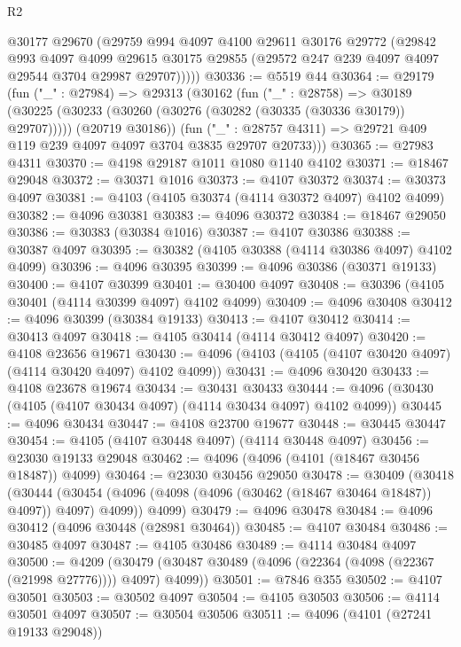 \begin{lexlean}{R2}
\begin{coremodule}
        @30177
        @29670
        (@29759
          @994
          @4097
          @4100
          @29611
          @30176
          @29772
          (@29842
            @993
            @4097
            @4099
            @29615
            @30175
            @29855
            (@29572 @247 @239 @4097 @4097 @29544 @3704 @29987 @29707)))))
@30336 := @5519 @44
@30364 := @29179
    (fun ("_" : @27984) =>
    @29313
      (@30162
        (fun ("_" : @28758) =>
        @30189
          (@30225 (@30233 (@30260 (@30276 (@30282 (@30335 (@30336 @30179)) @29707)))))
          (@20719 @30186))
        (fun ("_" : @28757 @4311) => @29721 @409 @119 @239 @4097 @4097 @3704 @3835 @29707 @20733)))
@30365 := @27983 @4311
@30370 := @4198 @29187 @1011 @1080 @1140 @4102
@30371 := @18467 @29048
@30372 := @30371 @1016
@30373 := @4107 @30372
@30374 := @30373 @4097
@30381 := @4103 (@4105 @30374 (@4114 @30372 @4097) @4102 @4099)
@30382 := @4096 @30381
@30383 := @4096 @30372
@30384 := @18467 @29050
@30386 := @30383 (@30384 @1016)
@30387 := @4107 @30386
@30388 := @30387 @4097
@30395 := @30382 (@4105 @30388 (@4114 @30386 @4097) @4102 @4099)
@30396 := @4096 @30395
@30399 := @4096 @30386 (@30371 @19133)
@30400 := @4107 @30399
@30401 := @30400 @4097
@30408 := @30396 (@4105 @30401 (@4114 @30399 @4097) @4102 @4099)
@30409 := @4096 @30408
@30412 := @4096 @30399 (@30384 @19133)
@30413 := @4107 @30412
@30414 := @30413 @4097
@30418 := @4105 @30414 (@4114 @30412 @4097)
@30420 := @4108 @23656 @19671
@30430 := @4096 (@4103 (@4105 (@4107 @30420 @4097) (@4114 @30420 @4097) @4102 @4099))
@30431 := @4096 @30420
@30433 := @4108 @23678 @19674
@30434 := @30431 @30433
@30444 := @4096 (@30430 (@4105 (@4107 @30434 @4097) (@4114 @30434 @4097) @4102 @4099))
@30445 := @4096 @30434
@30447 := @4108 @23700 @19677
@30448 := @30445 @30447
@30454 := @4105 (@4107 @30448 @4097) (@4114 @30448 @4097)
@30456 := @23030 @19133 @29048
@30462 := @4096 (@4096 (@4101 (@18467 @30456 @18487)) @4099)
@30464 := @23030 @30456 @29050
@30478 := @30409
    (@30418
      (@30444 (@30454 (@4096 (@4098 (@4096 (@30462 (@18467 @30464 @18487)) @4097)) @4097) @4099))
      @4099)
@30479 := @4096 @30478
@30484 := @4096 @30412 (@4096 @30448 (@28981 @30464))
@30485 := @4107 @30484
@30486 := @30485 @4097
@30487 := @4105 @30486
@30489 := @4114 @30484 @4097
@30500 := @4209
    (@30479 (@30487 @30489 (@4096 (@22364 (@4098 (@22367 (@21998 @27776)))) @4097) @4099))
@30501 := @7846 @355
@30502 := @4107 @30501
@30503 := @30502 @4097
@30504 := @4105 @30503
@30506 := @4114 @30501 @4097
@30507 := @30504 @30506
@30511 := @4096 (@4101 (@27241 @19133 @29048))

\end{coremodule}
\end{lexlean}
